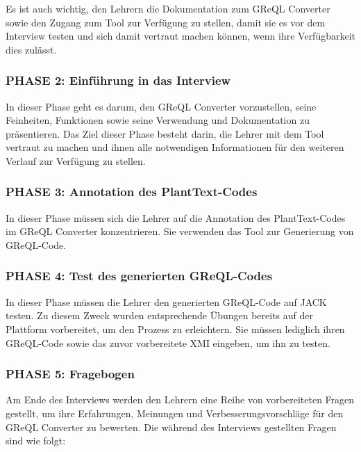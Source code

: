 Es ist auch wichtig, den Lehrern die Dokumentation zum GReQL Converter sowie den Zugang zum Tool zur Verfügung zu
stellen, damit sie es vor dem Interview testen und sich damit vertraut machen können, wenn ihre Verfügbarkeit dies
zulässt.

\subsubsection{PHASE 2: Einführung in das Interview}

In dieser Phase geht es darum, den GReQL Converter vorzustellen, seine Feinheiten, Funktionen sowie seine Verwendung und
Dokumentation zu präsentieren. Das Ziel dieser Phase besteht darin, die Lehrer mit dem Tool vertraut zu machen und
ihnen alle notwendigen Informationen für den weiteren Verlauf zur Verfügung zu stellen.

\subsubsection{PHASE 3: Annotation des PlantText-Codes}

In dieser Phase müssen sich die Lehrer auf die Annotation des PlantText-Codes im GReQL Converter konzentrieren. Sie
verwenden das Tool zur Generierung von GReQL-Code.

\subsubsection{PHASE 4: Test des generierten GReQL-Codes}

In dieser Phase müssen die Lehrer den generierten GReQL-Code auf JACK testen. Zu diesem Zweck wurden entsprechende
Übungen bereits auf der Plattform vorbereitet, um den Prozess zu erleichtern. Sie müssen lediglich ihren GReQL-Code
sowie das zuvor vorbereitete XMI eingeben, um ihn zu testen.

\subsubsection{PHASE 5: Fragebogen}

Am Ende des Interviews werden den Lehrern eine Reihe von vorbereiteten Fragen gestellt, um ihre Erfahrungen, Meinungen
und Verbesserungsvorschläge für den GReQL Converter zu bewerten. Die während des Interviews gestellten Fragen sind
wie folgt:

